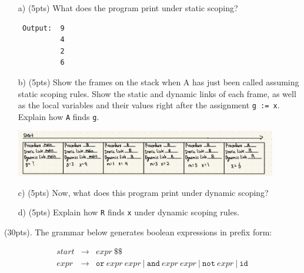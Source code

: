 \documentclass[11pt]{amsart}
\begin{document}
\begin{itemize}

\item[a)] (5pts) What does the program print under static scoping? 

\begin{verbatim}
 Output:  9
          4
          2
          6
\end{verbatim}

\newpage

\item[b)] (5pts) Show the frames on the stack when A has just been called assuming static scoping rules. Show the static and dynamic links of each frame, as well as the local variables and their values right after the assignment \texttt{g := x}. Explain how \texttt{A} finds \texttt{g}.

\vspace{0.2in}

\begin{center}
     \includegraphics[width=0.9\textwidth]{IMG_0084.jpg}
\end{center}

\vspace{0.2in}


\item[c)] (5pts) Now, what does this program print under dynamic scoping?
\item[d)] (5pts) Explain how \texttt{R} finds \texttt{x} under dynamic scoping rules.

\end{itemize}


\vspace{1in}


 (30pts). The grammar below
generates boolean expressions in prefix form:

\[\begin{array}{lll}
\mathit{start} & \rightarrow & \mathit{expr} \ \texttt{\$\$} \\
\mathit{expr} & \rightarrow & \texttt{or}\ \mathit{expr} \ \mathit{expr} \ | \ \texttt{and} \ \mathit{expr} \ \mathit{expr} \ | \ \texttt{not}\ \mathit{expr} \ | \ {\texttt {id}} \\
\end{array}\]
\end{document}
